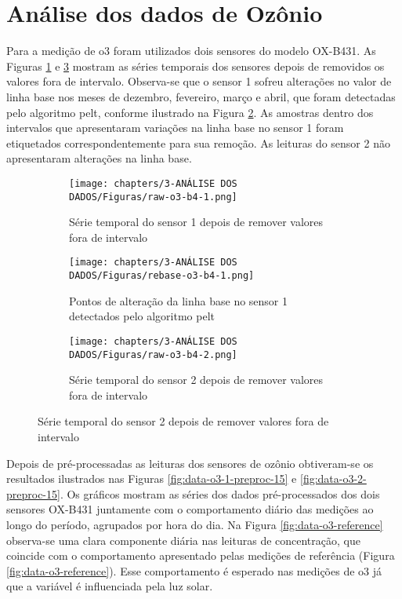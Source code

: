 \section{Análise dos dados de Ozônio}

Para a medição de \acrshort{o3} foram utilizados dois sensores do modelo OX-B431. As Figuras \ref{fig:data-o3-1-raw} e \ref{fig:data-o3-2-raw} mostram as séries temporais dos sensores depois de removidos os valores fora de intervalo. Observa-se que o sensor 1 sofreu alterações no valor de linha base nos meses de dezembro, fevereiro, março e abril, que foram detectadas pelo algoritmo \acrshort{pelt}, conforme ilustrado na Figura \ref{fig:data-rebase-o3-1}. As amostras dentro dos intervalos que apresentaram variações na linha base no sensor 1 foram etiquetados correspondentemente para sua remoção. As leituras do sensor 2 não apresentaram alterações na linha base.

\begin{figure}[h]
    \centering
    \caption{Série temporal dos sensores de \acrshort{o3} modelo OX-B431}
    \begin{subfigure}{0.495\textwidth}
        \texttt{[image: chapters/3-ANÁLISE DOS DADOS/Figuras/raw-o3-b4-1.png]}
        \caption{Série temporal do sensor 1 depois de remover valores fora de intervalo}
        \label{fig:data-o3-1-raw}
    \end{subfigure}
    \hfill
    \begin{subfigure}{0.495\textwidth}
        \texttt{[image: chapters/3-ANÁLISE DOS DADOS/Figuras/rebase-o3-b4-1.png]}
        \caption{Pontos de alteração da linha base no sensor 1 detectados pelo algoritmo \acrshort{pelt}}
        \label{fig:data-rebase-o3-1}
    \end{subfigure}
    \hfill
    \begin{subfigure}{0.495\textwidth}
        \texttt{[image: chapters/3-ANÁLISE DOS DADOS/Figuras/raw-o3-b4-2.png]}
        \caption{Série temporal do sensor 2 depois de remover valores fora de intervalo}
        \label{fig:data-o3-2-raw}
    \end{subfigure}
    \label{fig:data-o3-raw-and-pelt}
\end{figure}

Depois de pré-processadas as leituras dos sensores de ozônio obtiveram-se os resultados ilustrados nas Figuras \ref{fig:data-o3-1-preproc-15} e \ref{fig:data-o3-2-preproc-15}. Os gráficos mostram as séries dos dados pré-processados dos dois sensores OX-B431 juntamente com o comportamento diário das medições ao longo do período, agrupados por hora do dia. Na Figura \ref{fig:data-o3-reference} observa-se uma clara componente diária nas leituras de concentração, que coincide com o comportamento apresentado pelas medições de referência (Figura \ref{fig:data-o3-reference}). Esse comportamento é esperado nas medições de \acrshort{o3} já que a variável é influenciada pela luz solar.

